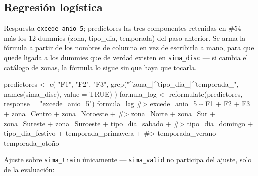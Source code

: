 \documentclass[
  spanish,
  letterpaper,
  DIV=11,
  numbers=noendperiod]{scrartcl}
\newenvironment{Shaded}{\begin{snugshade}}{\end{snugshade}}
\newcommand{\AttributeTok}[1]{\textcolor[rgb]{0.40,0.45,0.13}{#1}}
\newcommand{\CommentTok}[1]{\textcolor[rgb]{0.37,0.37,0.37}{#1}}
\newcommand{\ConstantTok}[1]{\textcolor[rgb]{0.56,0.35,0.01}{#1}}
\newcommand{\FunctionTok}[1]{\textcolor[rgb]{0.28,0.35,0.67}{#1}}
\newcommand{\NormalTok}[1]{\textcolor[rgb]{0.00,0.23,0.31}{#1}}
\newcommand{\OtherTok}[1]{\textcolor[rgb]{0.00,0.23,0.31}{#1}}
\newcommand{\StringTok}[1]{\textcolor[rgb]{0.13,0.47,0.30}{#1}}
\begin{document}
\subsection{Regresión logística}\label{regresiuxf3n-loguxedstica}

Respuesta \texttt{excede\_anio\_5}; predictores las tres componentes
retenidas en \#54 más los 12 dummies (zona, tipo\_dia, temporada) del
paso anterior. Se arma la fórmula a partir de los nombres de columna en
vez de escribirla a mano, para que quede ligada a los dummies que de
verdad existen en \texttt{sima\_disc} --- si cambia el catálogo de
zonas, la fórmula lo sigue sin que haya que tocarla.

\begin{Shaded}
\begin{Highlighting}[]
\NormalTok{predictores }\OtherTok{\textless{}{-}} \FunctionTok{c}\NormalTok{(}
    \StringTok{"F1"}\NormalTok{, }\StringTok{"F2"}\NormalTok{, }\StringTok{"F3"}\NormalTok{,}
    \FunctionTok{grep}\NormalTok{(}\StringTok{"\^{}zona\_|\^{}tipo\_dia\_|\^{}temporada\_"}\NormalTok{, }\FunctionTok{names}\NormalTok{(sima\_disc), }\AttributeTok{value =} \ConstantTok{TRUE}\NormalTok{)}
\NormalTok{)}
\NormalTok{formula\_log }\OtherTok{\textless{}{-}} \FunctionTok{reformulate}\NormalTok{(predictores, }\AttributeTok{response =} \StringTok{"excede\_anio\_5"}\NormalTok{)}
\NormalTok{formula\_log}
\CommentTok{\#\textgreater{} excede\_anio\_5 \textasciitilde{} F1 + F2 + F3 + zona\_Centro + zona\_Noroeste + }
\CommentTok{\#\textgreater{}     zona\_Norte + zona\_Sur + zona\_Sureste + zona\_Suroeste + tipo\_dia\_sabado + }
\CommentTok{\#\textgreater{}     tipo\_dia\_domingo + tipo\_dia\_festivo + temporada\_primavera + }
\CommentTok{\#\textgreater{}     temporada\_verano + temporada\_otoño}
\end{Highlighting}
\end{Shaded}

Ajuste sobre \texttt{sima\_train} únicamente --- \texttt{sima\_valid} no
participa del ajuste, solo de la evaluación:
\end{document}
